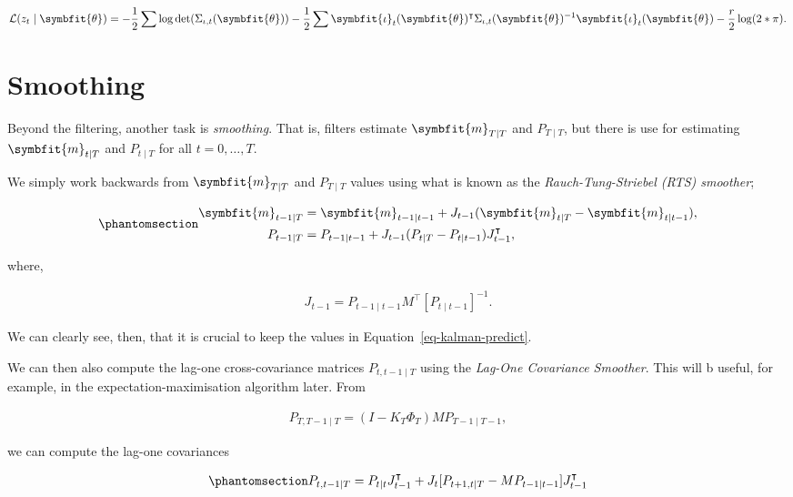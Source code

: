 \documentclass[
]{report}
\newcommand{\bv}[1]{\symbfit{#1}}
\theoremstyle{plain}
\theoremstyle{plain}
\theoremstyle{plain}
\theoremstyle{remark}
\begin{document}
\[\begin{split}
\mathcal L(z_t\mid\bv\theta) = -\frac12\sum \log\det(\Sigma_{\iota, t}(\bv\theta)) - \frac12 \sum\bv \iota_t(\bv\theta)^\intercal\Sigma_{\iota, t}(\bv\theta)^{-1} \bv \iota_t(\bv\theta) - \frac{r}{2}\log(2*\pi).
\end{split}
\]

\section{Smoothing}\label{smoothing}

Beyond the filtering, another task is \emph{smoothing}. That is, filters
estimate \(\bv m_{T\mid T}\) and \(P_{T\mid T}\), but there is use for
estimating \(\bv m_{t\mid T}\) and \(P_{t\mid T}\) for all
\(t=0,\dots, T\).

We simply work backwards from \(\bv m_{T\mid T}\) and \(P_{T\mid T}\)
values using what is known as the \emph{Rauch-Tung-Striebel (RTS)
smoother};

\begin{equation}\phantomsection\label{eq-kalmansmooth}{\begin{split}
\bv m_{t-1\mid T} &= \bv m_{t-1\mid t-1} + J_{t-1}(\bv m_{t\mid T} - \bv m_{t\mid t-1}),\\
P_{t-1\mid T} &= P_{t-1\mid t-1} + J_{t-1}(P_{t\mid T} - P_{t\mid t-1})J_{t-1}^\intercal,
\end{split}
}\end{equation}

where,

\[\begin{split}
J_{t-1} = P_{t-1\mid t-1}M^\intercal[P_{t\mid t-1}]^{-1}.
\end{split}
\]

We can clearly see, then, that it is crucial to keep the values in
Equation~\ref{eq-kalman-predict}.

We can then also compute the lag-one cross-covariance matrices
\(P_{t,t-1\mid T}\) using the \emph{Lag-One Covariance Smoother}. This
will b useful, for example, in the expectation-maximisation algorithm
later. From

\[\begin{split}
P_{T,T-1\mid T} = (I - K_T\Phi_{T}) MP_{T-1\mid T-1},
\end{split}
\]

we can compute the lag-one covariances

\begin{equation}\phantomsection\label{eq-lag1smooth}{\begin{split}
P_{t, t-1\mid T} = P_{t\mid t}J_{t-1}^\intercal + J_{t}[P_{t+1,t\mid T} - MP_{t-1\mid t-1}]J_{t-1}^\intercal
\end{split}
}\end{equation}
\end{document}
